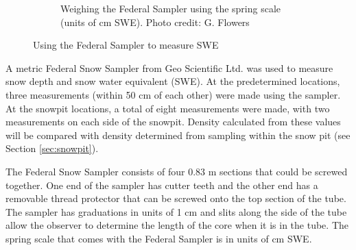 \documentclass{sfuthesis}
\begin{document}
\begin{figure}
\begin{subfigure}[b]{0.55\textwidth}
        \caption{Weighing the Federal Sampler using the spring scale (units of cm SWE). Photo credit: G. Flowers}
        \label{photo_swe2}
    \end{subfigure}

    \caption{Using the Federal Sampler to measure SWE}
    \label{photo_swe}
\end{figure}
 
A metric Federal Snow Sampler from Geo Scientific Ltd. was used to measure snow depth and snow water equivalent (SWE). At the predetermined locations, three measurements (within 50 cm of each other) were made using the sampler. At the snowpit locations, a total of eight measurements were made, with two measurements on each side of the snowpit. Density calculated from these values will be compared with density determined from sampling within the snow pit (see Section \ref{sec:snowpit}). 

The Federal Snow Sampler consists of four 0.83 m sections that could be screwed together. One end of the sampler has cutter teeth and the other end has a removable thread protector that can be screwed onto the top section of the tube. The sampler has graduations in units of 1 cm and slits along the side of the tube allow the observer to determine the length of the core when it is in the tube. The spring scale that comes with the Federal Sampler is in units of cm SWE.  
\end{document}
